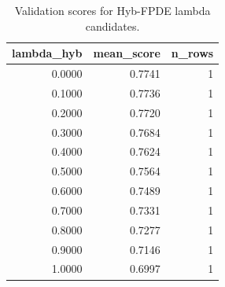 \begin{table}[t]
\caption{Validation scores for Hyb-FPDE lambda candidates.}
\label{tab:lambda_distribution_computed}
\centering
\begin{tabular}{rrr}
\toprule
lambda\_hyb & mean\_score & n\_rows \\
\midrule
0.0000 & 0.7741 & 1 \\
0.1000 & 0.7736 & 1 \\
0.2000 & 0.7720 & 1 \\
0.3000 & 0.7684 & 1 \\
0.4000 & 0.7624 & 1 \\
0.5000 & 0.7564 & 1 \\
0.6000 & 0.7489 & 1 \\
0.7000 & 0.7331 & 1 \\
0.8000 & 0.7277 & 1 \\
0.9000 & 0.7146 & 1 \\
1.0000 & 0.6997 & 1 \\
\bottomrule
\end{tabular}

\end{table}
